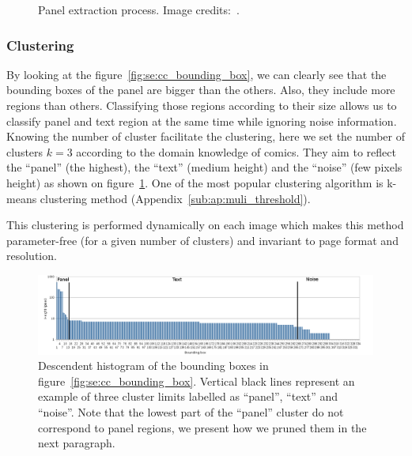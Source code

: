 \begin{figure}
		  \caption[Panel extraction process]{Panel extraction process. Image credits:~\cite{Bubble09}.}
	\end{figure}




\subsubsection{Clustering} %
\label{par:clustering}
By looking at the figure~\ref{fig:se:cc_bounding_box}, we can clearly see that the bounding boxes of the panel are bigger than the others.
Also, they include more regions than others.
Classifying those regions according to their size allows us to classify panel and text region at the same time while ignoring noise information.
Knowing the number of cluster facilitate the clustering, here 
we set the number of clusters $k=3$ according to the domain knowledge of comics.
They aim to reflect the ``panel'' (the highest), the ``text'' (medium height) and the ``noise'' (few pixels height) as shown on figure~\ref{fig:se:histo_roi}.
One of the most popular clustering algorithm is k-means clustering method (Appendix~\ref{sub:ap:muli_threshold}).


This clustering is performed dynamically on each image which makes this method parameter-free (for a given number of clusters) and invariant to page format and resolution.

	\begin{figure}[!ht]	%
	  \centering
		\includegraphics[trim= 5mm 0mm 10mm 0mm, clip,width=1.0\textwidth]{Histogram_en.png}
		\caption[Descendant histogram of the connected component bounding box heights]{Descendent histogram of the bounding boxes in figure~\ref{fig:se:cc_bounding_box}. Vertical black lines represent an example of three cluster limits labelled as ``panel'', ``text'' and ``noise''. Note that the lowest part of the ``panel'' cluster do not correspond to panel regions, we present how we pruned them in the next paragraph.}
		\label{fig:se:histo_roi}
	\end{figure}

